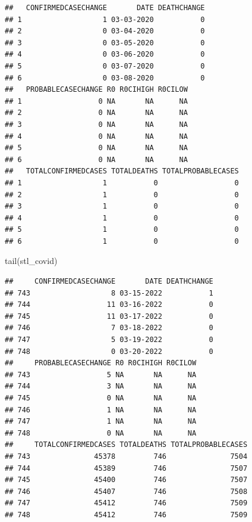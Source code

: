 \documentclass[
  krantz2]{krantz}
\makeatletter
\newenvironment{Shaded}{\begin{snugshade}}{\end{snugshade}}
\newcommand{\FunctionTok}[1]{\textcolor[rgb]{0,0,0}{#1}}
\newcommand{\NormalTok}[1]{#1}
\newenvironment{kframe}{%
\medskip{}
\setlength{\fboxsep}{.8em}
 \def\at@end@of@kframe{}%
 \ifinner\ifhmode%
  \def\at@end@of@kframe{\end{minipage}}%
  \begin{minipage}{\columnwidth}%
 \fi\fi%
 \def\FrameCommand##1{\hskip\@totalleftmargin \hskip-\fboxsep
 \colorbox{shadecolor}{##1}\hskip-\fboxsep
     \hskip-\linewidth \hskip-\@totalleftmargin \hskip\columnwidth}%
 \MakeFramed {\advance\hsize-\width
   \@totalleftmargin\z@ \linewidth\hsize
   \@setminipage}}%
 {\par\unskip\endMakeFramed%
 \at@end@of@kframe}
\renewenvironment{Shaded}{\begin{kframe}}{\end{kframe}}
\makeatother
\begin{document}
\begin{verbatim}
##   CONFIRMEDCASECHANGE       DATE DEATHCHANGE
## 1                   1 03-03-2020           0
## 2                   0 03-04-2020           0
## 3                   0 03-05-2020           0
## 4                   0 03-06-2020           0
## 5                   0 03-07-2020           0
## 6                   0 03-08-2020           0
##   PROBABLECASECHANGE R0 R0CIHIGH R0CILOW
## 1                  0 NA       NA      NA
## 2                  0 NA       NA      NA
## 3                  0 NA       NA      NA
## 4                  0 NA       NA      NA
## 5                  0 NA       NA      NA
## 6                  0 NA       NA      NA
##   TOTALCONFIRMEDCASES TOTALDEATHS TOTALPROBABLECASES
## 1                   1           0                  0
## 2                   1           0                  0
## 3                   1           0                  0
## 4                   1           0                  0
## 5                   1           0                  0
## 6                   1           0                  0
\end{verbatim}

\begin{Shaded}
\begin{Highlighting}[]
\FunctionTok{tail}\NormalTok{(stl\_covid)}
\end{Highlighting}
\end{Shaded}

\begin{verbatim}
##     CONFIRMEDCASECHANGE       DATE DEATHCHANGE
## 743                   8 03-15-2022           1
## 744                  11 03-16-2022           0
## 745                  11 03-17-2022           0
## 746                   7 03-18-2022           0
## 747                   5 03-19-2022           0
## 748                   0 03-20-2022           0
##     PROBABLECASECHANGE R0 R0CIHIGH R0CILOW
## 743                  5 NA       NA      NA
## 744                  3 NA       NA      NA
## 745                  0 NA       NA      NA
## 746                  1 NA       NA      NA
## 747                  1 NA       NA      NA
## 748                  0 NA       NA      NA
##     TOTALCONFIRMEDCASES TOTALDEATHS TOTALPROBABLECASES
## 743               45378         746               7504
## 744               45389         746               7507
## 745               45400         746               7507
## 746               45407         746               7508
## 747               45412         746               7509
## 748               45412         746               7509
\end{verbatim}
\end{document}
